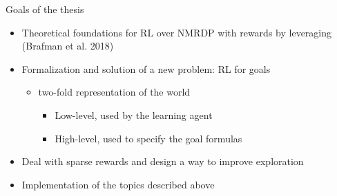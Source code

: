 \documentclass{beamer}
\begin{document}


\begin{frame}{Goals of the thesis}

\begin{itemize}
\item Theoretical foundations for RL over NMRDP with \LLf rewards by leveraging (Brafman et al. 2018)

\vskip 0.5cm

\item Formalization and solution of a new problem: RL for \LLf goals 
\begin{itemize}
	\item two-fold representation of the world
	\begin{itemize}
		\item Low-level, used by the learning agent 
		\item High-level, used to specify the goal formulas 
	\end{itemize}


\end{itemize}

\vskip 0.5cm

\item Deal with sparse rewards and design a way to improve exploration

\vskip 0.5cm

\item Implementation of the topics described above

\end{itemize}

\end{frame}

\end{document}
